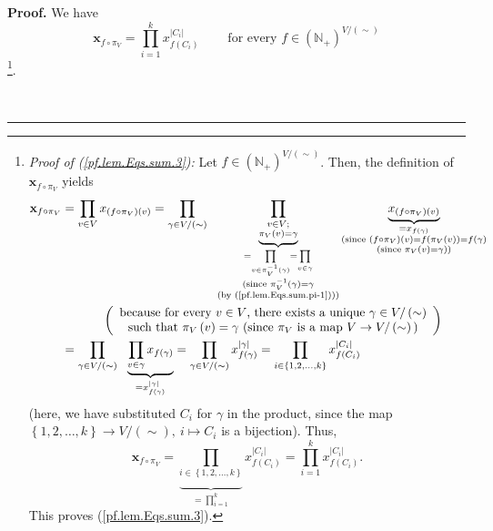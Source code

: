\documentclass[numbers=enddot,12pt,final,onecolumn,notitlepage]{scrartcl}%
\theoremstyle{definition}
\newenvironment{proof}[1][Proof]{\noindent\textbf{#1.} }{\ \rule{0.5em}{0.5em}}
\newenvironment{verlong}{}{}
\let\prodnonlimits\prod
\renewcommand{\prod}{\prodnonlimits\limits}
\begin{document}
\begin{verlong}
\begin{proof}
We have%
\begin{equation}
\mathbf{x}_{f\circ\pi_{V}}=\prod_{i=1}^{k}x_{f\left(  C_{i}\right)
}^{\left\vert C_{i}\right\vert }\ \ \ \ \ \ \ \ \ \ \text{for every }%
f\in\left(  \mathbb{N}_{+}\right)  ^{V/\left(  \sim\right)  }
\label{pf.lem.Eqs.sum.3}%
\end{equation}
\footnote{\textit{Proof of (\ref{pf.lem.Eqs.sum.3}):} Let $f\in\left(
\mathbb{N}_{+}\right)  ^{V/\left(  \sim\right)  }$. Then, the definition of
$\mathbf{x}_{f\circ\pi_{V}}$ yields%
\begin{align*}
\mathbf{x}_{f\circ\pi_{V}}  &  =\prod_{v\in V}x_{\left(  f\circ\pi_{V}\right)
\left(  v\right)  }=\prod_{\gamma\in V/\left(  \sim\right)  }%
\ \ \underbrace{\prod_{\substack{v\in V;\\\pi_{V}\left(  v\right)  =\gamma}%
}}_{\substack{=\prod_{v\in\pi_{V}^{-1}\left(  \gamma\right)  }=\prod
_{v\in\gamma}\\\text{(since }\pi_{V}^{-1}\left(  \gamma\right)  =\gamma
\\\text{(by (\ref{pf.lem.Eqs.sum.pi-1})))}}}\underbrace{x_{\left(  f\circ
\pi_{V}\right)  \left(  v\right)  }}_{\substack{=x_{f\left(  \gamma\right)
}\\\text{(since }\left(  f\circ\pi_{V}\right)  \left(  v\right)  =f\left(
\pi_{V}\left(  v\right)  \right)  =f\left(  \gamma\right)  \\\text{(since }%
\pi_{V}\left(  v\right)  =\gamma\text{))}}}\\
&  \ \ \ \ \ \ \ \ \ \ \left(
\begin{array}
[c]{c}%
\text{because for every }v\in V\text{, there exists a unique }\gamma\in
V/\left(  \sim\right) \\
\text{such that }\pi_{V}\left(  v\right)  =\gamma\text{ (since }\pi_{V}\text{
is a map }V\rightarrow V/\left(  \sim\right)  \text{)}%
\end{array}
\right) \\
&  =\prod_{\gamma\in V/\left(  \sim\right)  }\ \ \underbrace{\prod_{v\in
\gamma}x_{f\left(  \gamma\right)  }}_{=x_{f\left(  \gamma\right)
}^{\left\vert \gamma\right\vert }}=\prod_{\gamma\in V/\left(  \sim\right)
}x_{f\left(  \gamma\right)  }^{\left\vert \gamma\right\vert }=\prod
_{i\in\left\{  1,2,\ldots,k\right\}  }x_{f\left(  C_{i}\right)  }^{\left\vert
C_{i}\right\vert }%
\end{align*}
(here, we have substituted $C_{i}$ for $\gamma$ in the product, since the map
$\left\{  1,2,\ldots,k\right\}  \rightarrow V/\left(  \sim\right)  ,\ i\mapsto
C_{i}$ is a bijection). Thus,%
\[
\mathbf{x}_{f\circ\pi_{V}}=\underbrace{\prod_{i\in\left\{  1,2,\ldots
,k\right\}  }}_{=\prod_{i=1}^{k}}x_{f\left(  C_{i}\right)  }^{\left\vert
C_{i}\right\vert }=\prod_{i=1}^{k}x_{f\left(  C_{i}\right)  }^{\left\vert
C_{i}\right\vert }.
\]
This proves (\ref{pf.lem.Eqs.sum.3}).}.


\end{proof}
\end{verlong}
\end{document}
